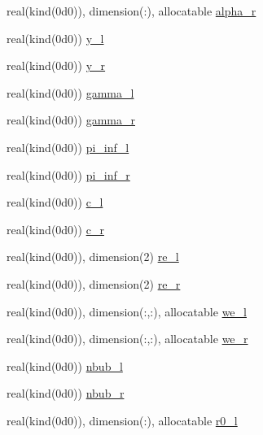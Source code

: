 \begin{Indent}
\begin{DoxyCompactItemize}
\item 
real(kind(0d0)), dimension(\+:), allocatable \hyperlink{namespacem__riemann__solvers_abdd33525dd128beda2d0c33454e0d9de}{alpha\+\_\+r}
\item 
real(kind(0d0)) \hyperlink{namespacem__riemann__solvers_ad79d372c1bc1971b870ab2c455d9ff90}{y\+\_\+l}
\item 
real(kind(0d0)) \hyperlink{namespacem__riemann__solvers_aef2c7eeabded0734aaa0cd95adac91ab}{y\+\_\+r}
\item 
real(kind(0d0)) \hyperlink{namespacem__riemann__solvers_a8159569b322091efa55bbeb377532352}{gamma\+\_\+l}
\item 
real(kind(0d0)) \hyperlink{namespacem__riemann__solvers_ac422e0817e2011364cc6fc9c9a56b82b}{gamma\+\_\+r}
\item 
real(kind(0d0)) \hyperlink{namespacem__riemann__solvers_ac90ee6bf146aa47944bb11cd5de0a580}{pi\+\_\+inf\+\_\+l}
\item 
real(kind(0d0)) \hyperlink{namespacem__riemann__solvers_a925187e709792a5fcfa80daebd568e8f}{pi\+\_\+inf\+\_\+r}
\item 
real(kind(0d0)) \hyperlink{namespacem__riemann__solvers_a9c1dab7bfde55cdc6f738752c077f08a}{c\+\_\+l}
\item 
real(kind(0d0)) \hyperlink{namespacem__riemann__solvers_a9393a8d17da2a98f5061804baca0349d}{c\+\_\+r}
\item 
real(kind(0d0)), dimension(2) \hyperlink{namespacem__riemann__solvers_a2a804f5759af46c82fdd62633b5e7605}{re\+\_\+l}
\item 
real(kind(0d0)), dimension(2) \hyperlink{namespacem__riemann__solvers_a31045aff8e978fd620943eaed4fbb973}{re\+\_\+r}
\item 
real(kind(0d0)), dimension(\+:,\+:), allocatable \hyperlink{namespacem__riemann__solvers_a953a81975cc1627c87baca12ed51ed95}{we\+\_\+l}
\item 
real(kind(0d0)), dimension(\+:,\+:), allocatable \hyperlink{namespacem__riemann__solvers_ab9b568d4ea77b665c1f6cea77144acc8}{we\+\_\+r}
\item 
real(kind(0d0)) \hyperlink{namespacem__riemann__solvers_afbf6423349d95b7b3472eb84b9ba7f56}{nbub\+\_\+l}
\item 
real(kind(0d0)) \hyperlink{namespacem__riemann__solvers_a4b6ffaeeaa4365c642ef3a5295635b07}{nbub\+\_\+r}
\item 
real(kind(0d0)), dimension(\+:), allocatable \hyperlink{namespacem__riemann__solvers_af0757998bd9843f9bb978a600d0ae2b0}{r0\+\_\+l}
\item 

\end{DoxyCompactItemize}
\end{Indent}
